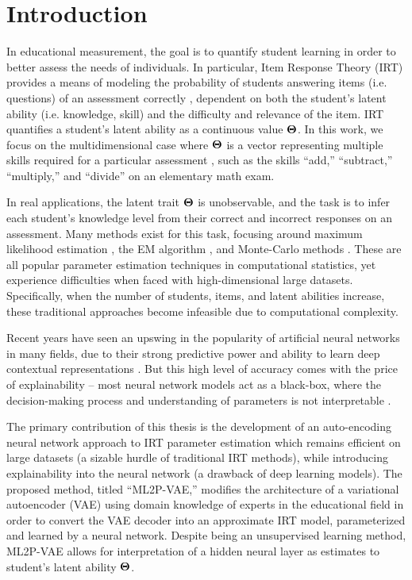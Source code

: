 \chapter{Introduction}

In educational measurement, the goal is to quantify student learning in order to better assess the needs of individuals. In particular, Item Response Theory (IRT) provides a means of modeling the probability of students answering items (i.e. questions) of an assessment correctly \cite{lord1968}, dependent on both the student's latent ability (i.e. knowledge, skill) and the difficulty and relevance of the item. IRT quantifies a student's latent ability as a continuous value $\boldsymbol{\Theta}$. In this work, we focus on the multidimensional case where $\boldsymbol{\Theta}$ is a vector representing multiple skills required for a particular assessment \cite{reckase2009multidimensional}, such as the skills ``add,'' ``subtract,'' ``multiply,'' and ``divide'' on an elementary math exam.

In real applications, the latent trait $\boldsymbol{\Theta}$ is unobservable, and the task is to infer each student's knowledge level from their correct and incorrect responses on an assessment. Many methods exist for this task, focusing around maximum likelihood estimation \cite{baker_kim2004, chen2019}, the EM algorithm \cite{bock1981, Feng2014}, and Monte-Carlo methods \cite{cai2010, patz1999}. These are all popular parameter estimation techniques in computational statistics, yet experience difficulties when faced with high-dimensional large datasets. Specifically, when the number of students, items, and latent abilities increase, these traditional approaches become infeasible due to computational complexity. 

Recent years have seen an upswing in the popularity of artificial neural networks in many fields, due to their strong predictive power and ability to learn deep contextual representations \cite{neural_net, vaswani2017}. But this high level of accuracy comes with the price of explainability -- most neural network models act as a black-box, where the decision-making process and understanding of parameters is not interpretable \cite{zhang2018interpretable}.

The primary contribution of this thesis is the development of an auto-encoding neural network approach to IRT parameter estimation which remains efficient on large datasets (a sizable hurdle of traditional IRT methods), while introducing explainability into the neural network (a drawback of deep learning models). The proposed method, titled ``ML2P-VAE,'' modifies the architecture of a variational autoencoder (VAE) \cite{kingma2014} using domain knowledge of experts in the educational field \cite{daSilva2018, guo2017} in order to convert the VAE decoder into an approximate IRT model, parameterized and learned by a neural network. Despite being an unsupervised learning method, ML2P-VAE allows for interpretation of a hidden neural layer as estimates to student's latent ability $\boldsymbol{\Theta}$.

